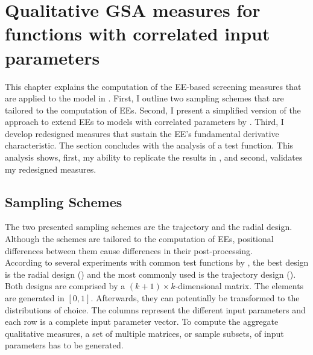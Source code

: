 
\section{Qualitative GSA measures for functions with correlated input parameters}
\thispagestyle{plain} %

This chapter explains the computation of the EE-based screening measures that are applied to the model in \cite{Keane.1994}.
First, I outline two sampling schemes that are tailored to the computation of EEs. Second, I present a simplified version of the approach to extend EEs to models with correlated parameters by \cite{ge2017extending}. Third, I develop redesigned measures that sustain the EE's fundamental derivative characteristic. The section concludes with the analysis of a test function. This analysis shows, first, my ability to replicate the results in \cite{ge2017extending}, and second, validates my redesigned measures.


\subsection{Sampling Schemes}

The two presented sampling schemes are the trajectory and the radial design. Although the schemes are tailored to the computation of EEs, positional differences between them cause differences in their post-processing.\\

\noindent
According to several experiments with common test functions by \cite{campolongo2011screening}, the best design is the radial design (\cite{saltelli2002making}) and the most commonly used is the trajectory design (\cite{Morris.1991}).
Both designs are comprised by a $(k + 1) \times k$-dimensional matrix. The elements are generated in $[0,1]$. Afterwards, they can potentially be transformed to the distributions of choice. The columns represent the different input parameters and each row is a complete input parameter vector. To compute the aggregate qualitative measures, a set of multiple matrices, or sample subsets, of input parameters has to be generated.\\

